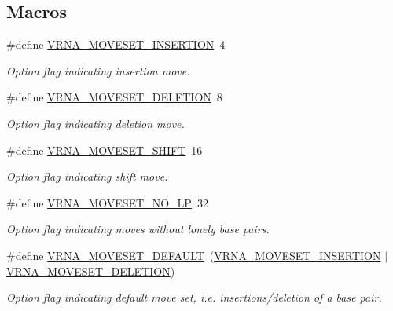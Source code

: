 \subsection*{Macros}
\begin{DoxyCompactItemize}
\item 
\#define \mbox{\hyperlink{group__neighbors_gaf39028db9c70d3be528929182a3f2d5a}{V\+R\+N\+A\+\_\+\+M\+O\+V\+E\+S\+E\+T\+\_\+\+I\+N\+S\+E\+R\+T\+I\+ON}}~4
\begin{DoxyCompactList}\small\item\em Option flag indicating insertion move. \end{DoxyCompactList}\item 
\#define \mbox{\hyperlink{group__neighbors_gac05db9392c6647e3e9a6982096c5b384}{V\+R\+N\+A\+\_\+\+M\+O\+V\+E\+S\+E\+T\+\_\+\+D\+E\+L\+E\+T\+I\+ON}}~8
\begin{DoxyCompactList}\small\item\em Option flag indicating deletion move. \end{DoxyCompactList}\item 
\#define \mbox{\hyperlink{group__neighbors_ga68ea27c81de4b74e48b775c04052590b}{V\+R\+N\+A\+\_\+\+M\+O\+V\+E\+S\+E\+T\+\_\+\+S\+H\+I\+FT}}~16
\begin{DoxyCompactList}\small\item\em Option flag indicating shift move. \end{DoxyCompactList}\item 
\#define \mbox{\hyperlink{group__neighbors_ga258084b251b218fba9398826435a4393}{V\+R\+N\+A\+\_\+\+M\+O\+V\+E\+S\+E\+T\+\_\+\+N\+O\+\_\+\+LP}}~32
\begin{DoxyCompactList}\small\item\em Option flag indicating moves without lonely base pairs. \end{DoxyCompactList}\item 
\#define \mbox{\hyperlink{group__neighbors_gaa5ffec4dd0d02df320f123e6888154d1}{V\+R\+N\+A\+\_\+\+M\+O\+V\+E\+S\+E\+T\+\_\+\+D\+E\+F\+A\+U\+LT}}~(\mbox{\hyperlink{group__neighbors_gaf39028db9c70d3be528929182a3f2d5a}{V\+R\+N\+A\+\_\+\+M\+O\+V\+E\+S\+E\+T\+\_\+\+I\+N\+S\+E\+R\+T\+I\+ON}} $\vert$ \mbox{\hyperlink{group__neighbors_gac05db9392c6647e3e9a6982096c5b384}{V\+R\+N\+A\+\_\+\+M\+O\+V\+E\+S\+E\+T\+\_\+\+D\+E\+L\+E\+T\+I\+ON}})
\begin{DoxyCompactList}\small\item\em Option flag indicating default move set, i.\+e. insertions/deletion of a base pair. \end{DoxyCompactList}\item 

\end{DoxyCompactItemize}
